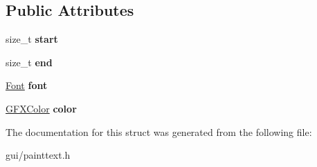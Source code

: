 \subsection*{Public Attributes}
\begin{DoxyCompactItemize}
\item 
size\+\_\+t {\bfseries start}\hypertarget{structPaintText_1_1TextFragment_a11021ce73a8bbd05155bbdc90dbf7d6c}{}\label{structPaintText_1_1TextFragment_a11021ce73a8bbd05155bbdc90dbf7d6c}

\item 
size\+\_\+t {\bfseries end}\hypertarget{structPaintText_1_1TextFragment_aaf3001af307044515a8313c0e3ec4419}{}\label{structPaintText_1_1TextFragment_aaf3001af307044515a8313c0e3ec4419}

\item 
\hyperlink{classFont}{Font} {\bfseries font}\hypertarget{structPaintText_1_1TextFragment_a1d1b1a8e4614e786cc6c9914d2cc32c0}{}\label{structPaintText_1_1TextFragment_a1d1b1a8e4614e786cc6c9914d2cc32c0}

\item 
\hyperlink{structGFXColor}{G\+F\+X\+Color} {\bfseries color}\hypertarget{structPaintText_1_1TextFragment_ad8168284e46f313ff1e7f5e617629281}{}\label{structPaintText_1_1TextFragment_ad8168284e46f313ff1e7f5e617629281}

\end{DoxyCompactItemize}


The documentation for this struct was generated from the following file\+:\begin{DoxyCompactItemize}
\item 
gui/painttext.\+h\end{DoxyCompactItemize}
